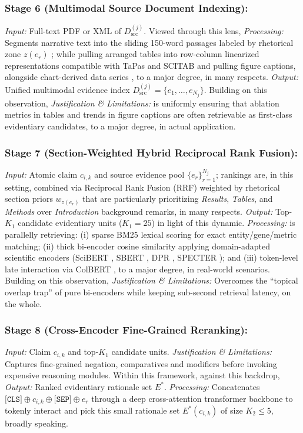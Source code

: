 \documentclass[sigconf]{acmart}
\begin{document}
\subsubsection{Stage 6 (Multimodal Source Document Indexing):}
\emph{Input:} Full-text PDF or XML of $D_{\text{src}}^{(j)}$. Viewed through this lens, \emph{Processing:} Segments narrative text into the sliding 150-word passages labeled by rhetorical zone $z(e_r)$ \cite{teufel2006automatic}; while pulling arranged tables into row-column linearized representations compatible with TaPas \cite{herzig2020tapas} and SCITAB \cite{lu2023scitab} and pulling figure captions, alongside chart-derived data series \cite{akhtar2023reading}, to a major degree, in many respects. \emph{Output:} Unified multimodal evidence index $D_{\text{src}}^{(j)} = \{e_1, \dots, e_{N_j}\}$. Building on this observation, \emph{Justification \& Limitations:} is uniformly ensuring that ablation metrics in tables and trends in figure captions are often retrievable as first-class evidentiary candidates, to a major degree, in actual application.

\subsubsection{Stage 7 (Section-Weighted Hybrid Reciprocal Rank Fusion):}
\emph{Input:} Atomic claim $c_{i,k}$ and source evidence pool $\{e_r\}_{r=1}^{N_j}$; rankings are, in this setting, combined via Reciprocal Rank Fusion (RRF) \cite{cormack2009reciprocal} weighted by rhetorical section priors $w_{z(e_r)}$ that are particularly prioritizing \emph{Results}, \emph{Tables}, and \emph{Methods} over \emph{Introduction} background remarks, in many respects. \emph{Output:} Top-$K_1$ candidate evidentiary units ($K_1 = 25$) in light of this dynamic. \emph{Processing:} is parallelly retrieving: (i) sparse BM25 lexical scoring \cite{robertson2009probabilistic} for exact entity/gene/metric matching; (ii) thick bi-encoder cosine similarity applying domain-adapted scientific encoders (SciBERT \cite{beltagy2019scibert}, SBERT \cite{reimers2019sentence}, DPR \cite{karpukhin2020dense}, SPECTER \cite{cohan2020specter}); and (iii) token-level late interaction via ColBERT \cite{khattab2020colbert}, to a major degree, in real-world scenarios. Building on this observation, \emph{Justification \& Limitations:} Overcomes the ``topical overlap trap'' of pure bi-encoders while keeping sub-second retrieval latency, on the whole.

\subsubsection{Stage 8 (Cross-Encoder Fine-Grained Reranking):}
\emph{Input:} Claim $c_{i,k}$ and top-$K_1$ candidate units. \emph{Justification \& Limitations:} Captures fine-grained negation, comparatives and modifiers before invoking expensive reasoning modules. Within this framework, against this backdrop, \emph{Output:} Ranked evidentiary rationale set $E^*$. \emph{Processing:} Concatenates $\texttt{[CLS]} \oplus c_{i,k} \oplus \texttt{[SEP]} \oplus e_r$ through a deep cross-attention transformer backbone to tokenly interact and pick this small rationale set $E^*(c_{i,k})$ of size $K_2 \leq 5$, broadly speaking.
\end{document}
